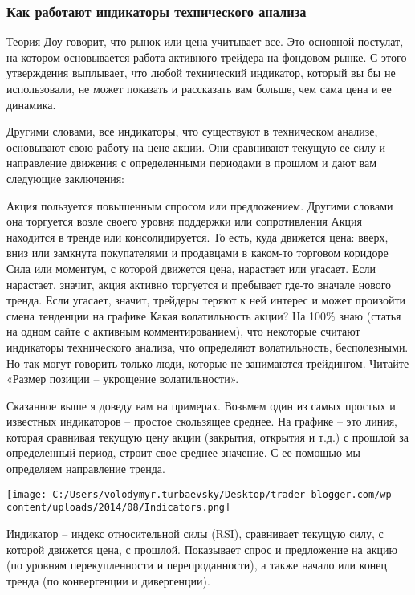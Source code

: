 \documentclass[a5paper]{article}
\begin{document}
\subsubsection{Как работают индикаторы технического анализа}

Теория Доу говорит, что рынок или цена учитывает все. Это основной постулат, на котором основывается работа активного трейдера на фондовом рынке. С этого утверждения выплывает, что любой технический индикатор, который вы бы не использовали, не может показать и рассказать вам больше, чем сама цена и ее динамика.

Другими словами, все индикаторы, что существуют в техническом анализе, основывают свою работу на цене акции. Они сравнивают текущую ее силу и направление движения с определенными периодами в прошлом и дают вам следующие заключения:

    Акция пользуется повышенным спросом или предложением. Другими словами она торгуется возле своего уровня поддержки или сопротивления
    Акция находится в тренде или консолидируется. То есть, куда движется цена: вверх, вниз или замкнута покупателями и продавцами в каком-то торговом коридоре
    Сила или моментум, с которой движется цена, нарастает или угасает. Если нарастает, значит, акция активно торгуется и пребывает где-то вначале нового тренда. Если угасает, значит, трейдеры теряют к ней интерес и может произойти смена тенденции на графике
    Какая волатильность акции? На 100\% знаю (статья на одном сайте с активным комментированием), что некоторые считают индикаторы технического анализа, что определяют волатильность, бесполезными. Но так могут говорить только люди, которые не занимаются трейдингом. Читайте «Размер позиции – укрощение волатильности».

Сказанное выше я доведу вам на примерах. Возьмем один из самых простых
и известных индикаторов – простое скользящее среднее. На графике – это
линия, которая сравнивая текущую цену акции (закрытия, открытия и
т.д.) с прошлой за определенный период, строит свое среднее
значение. С ее помощью мы определяем направление тренда.

\texttt{[image: C:/Users/volodymyr.turbaevsky/Desktop/trader-blogger.com/wp-content/uploads/2014/08/Indicators.png]}

Индикатор – индекс относительной силы (RSI), сравнивает текущую силу,
с которой движется цена, с прошлой. Показывает спрос и предложение на
акцию (по уровням перекупленности и перепроданности), а также начало
или конец тренда (по конвергенции и дивергенции).
\end{document}
